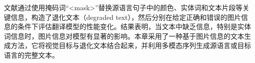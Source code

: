 文献\cite{53_caglayan-etal-2019-probing}通过使用掩码词“<mask>”替换源语言句子中的颜色、实体词和文本片段等关键信息，构造了退化文本（degraded text），然后分别在给定正确和错误的图片信息的条件下评估翻译模型的性能变化。结果表明，当文本中缺乏信息，特别是实体词信息时，图片信息对模型有显著的影响。本章采用了一种基于图片信息的文本生成方法，它将视觉目标与退化文本结合起来，并利用多模态序列生成源语言或目标语言的完整文本。


